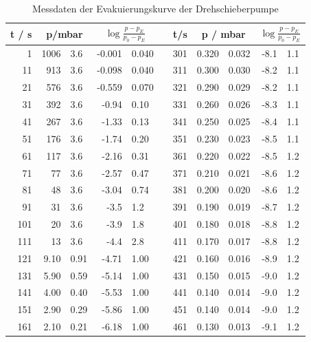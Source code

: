 \begin{table}[H]
\centering
\caption{Messdaten der Evakuierungskurve der Drehschieberpumpe}
\label{tab:10}
\begin{tabular}{|r|r@{\,$\pm$\,}l|r@{\,$\pm$\,}l|p{0.5cm}|r|r@{\,$\pm$\,}l|r@{\,$\pm$\,}l|}
\hline
t / s & \multicolumn{2}{c|}{p/\unit{\milli\bar}} & \multicolumn{2}{c|}{$\log{\frac{p-p_E}{p_0-p_E}}$} & & t/s & \multicolumn{2}{c|}{p / \unit{\milli\bar}} & \multicolumn{2}{c|}{$\log{\frac{p-p_E}{p_0-p_E}}$} \\
\hline
1   & 1006   & 3.6    & -0.001 & 0.040  & & 301 & 0.320  & 0.032  & -8.1   & 1.1   \\
11  & 913    & 3.6    & -0.098 & 0.040  & & 311 & 0.300  & 0.030  & -8.2   & 1.1   \\
21  & 576    & 3.6    & -0.559 & 0.070  & & 321 & 0.290  & 0.029  & -8.2   & 1.1   \\
31  & 392    & 3.6    & -0.94  & 0.10   & & 331 & 0.260  & 0.026  & -8.3   & 1.1   \\
41  & 267    & 3.6    & -1.33  & 0.13   & & 341 & 0.250  & 0.025  & -8.4   & 1.1   \\
51  & 176    & 3.6    & -1.74  & 0.20   & & 351 & 0.230  & 0.023  & -8.5   & 1.1   \\
61  & 117    & 3.6    & -2.16  & 0.31   & & 361 & 0.220  & 0.022  & -8.5   & 1.2   \\
71  & 77     & 3.6    & -2.57  & 0.47   & & 371 & 0.210  & 0.021  & -8.6   & 1.2   \\
81  & 48     & 3.6    & -3.04  & 0.74   & & 381 & 0.200  & 0.020  & -8.6   & 1.2   \\
91  & 31     & 3.6    & -3.5   & 1.2    & & 391 & 0.190  & 0.019  & -8.7   & 1.2   \\
101 & 20     & 3.6    & -3.9   & 1.8    & & 401 & 0.180  & 0.018  & -8.8   & 1.2   \\
111 & 13     & 3.6    & -4.4   & 2.8    & & 411 & 0.170  & 0.017  & -8.8   & 1.2   \\
121 & 9.10   & 0.91   & -4.71  & 1.00   & & 421 & 0.160  & 0.016  & -8.9   & 1.2   \\
131 & 5.90   & 0.59   & -5.14  & 1.00   & & 431 & 0.150  & 0.015  & -9.0   & 1.2   \\
141 & 4.00   & 0.40   & -5.53  & 1.00   & & 441 & 0.140  & 0.014  & -9.0   & 1.2   \\
151 & 2.90   & 0.29   & -5.86  & 1.00   & & 451 & 0.140  & 0.014  & -9.0   & 1.2   \\
161 & 2.10   & 0.21   & -6.18  & 1.00   & & 461 & 0.130  & 0.013  & -9.1   & 1.2   \\

\end{tabular}
\end{table}
